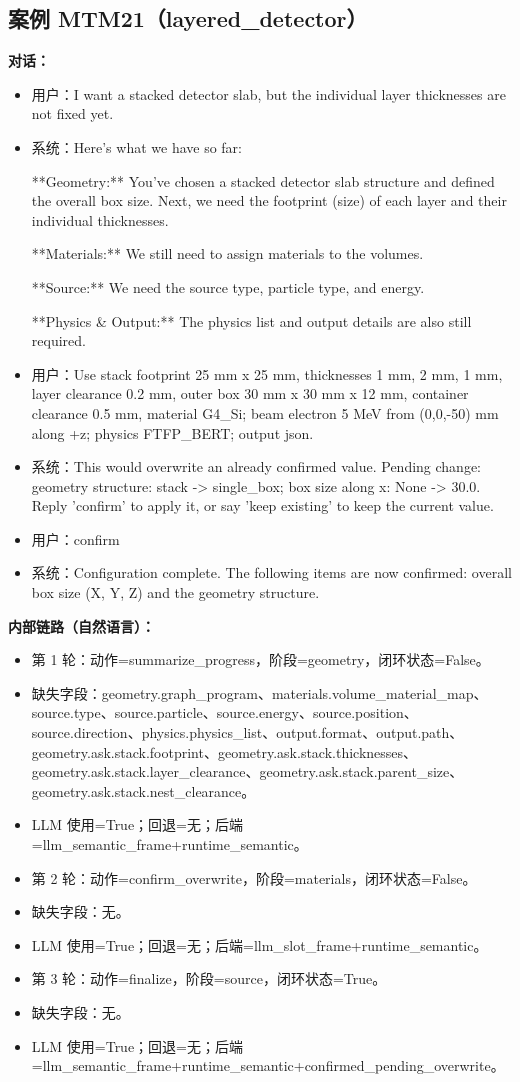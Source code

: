 \documentclass[11pt]{ctexart}
\begin{document}
\subsection{案例 MTM21（layered\_detector）}
\textbf{对话：}
\begin{itemize}
\item 用户：I want a stacked detector slab, but the individual layer thicknesses are not fixed yet.
\item 系统：Here's what we have so far:

**Geometry:** You've chosen a stacked detector slab structure and defined the overall box size. Next, we need the footprint (size) of each layer and their individual thicknesses.

**Materials:** We still need to assign materials to the volumes.

**Source:** We need the source type, particle type, and energy.

**Physics \& Output:** The physics list and output details are also still required.
\item 用户：Use stack footprint 25 mm x 25 mm, thicknesses 1 mm, 2 mm, 1 mm, layer clearance 0.2 mm, outer box 30 mm x 30 mm x 12 mm, container clearance 0.5 mm, material G4\_Si; beam electron 5 MeV from (0,0,-50) mm along +z; physics FTFP\_BERT; output json.
\item 系统：This would overwrite an already confirmed value. Pending change: geometry structure: stack -> single\_box; box size along x: None -> 30.0. Reply 'confirm' to apply it, or say 'keep existing' to keep the current value.
\item 用户：confirm
\item 系统：Configuration complete. The following items are now confirmed: overall box size (X, Y, Z) and the geometry structure.
\end{itemize}
\textbf{内部链路（自然语言）：}
\begin{itemize}
\item 第 1 轮：动作=summarize\_progress，阶段=geometry，闭环状态=False。
\item 缺失字段：geometry.graph\_program、materials.volume\_material\_map、source.type、source.particle、source.energy、source.position、source.direction、physics.physics\_list、output.format、output.path、geometry.ask.stack.footprint、geometry.ask.stack.thicknesses、geometry.ask.stack.layer\_clearance、geometry.ask.stack.parent\_size、geometry.ask.stack.nest\_clearance。
\item LLM 使用=True；回退=无；后端=llm\_semantic\_frame+runtime\_semantic。
\item 第 2 轮：动作=confirm\_overwrite，阶段=materials，闭环状态=False。
\item 缺失字段：无。
\item LLM 使用=True；回退=无；后端=llm\_slot\_frame+runtime\_semantic。
\item 第 3 轮：动作=finalize，阶段=source，闭环状态=True。
\item 缺失字段：无。
\item LLM 使用=True；回退=无；后端=llm\_semantic\_frame+runtime\_semantic+confirmed\_pending\_overwrite。
\end{itemize}
\end{document}
